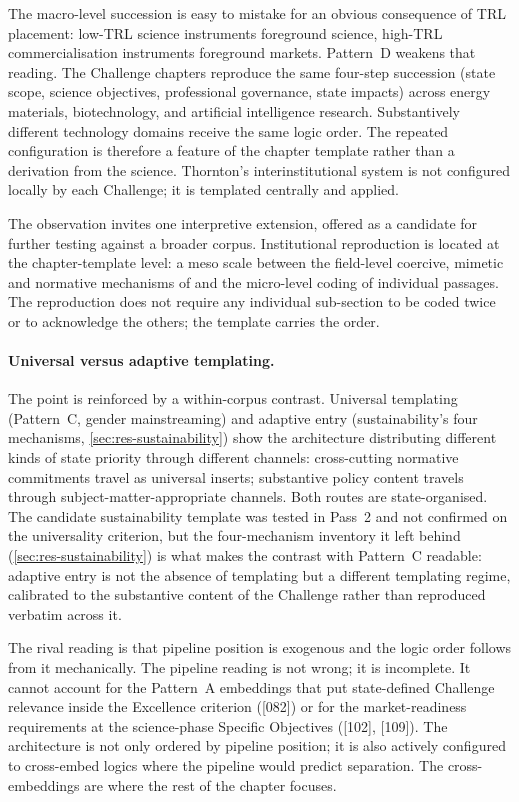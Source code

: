 The macro-level succession is easy to mistake for an obvious
consequence of TRL placement: low-TRL science instruments foreground
science, high-TRL commercialisation instruments foreground markets.
Pattern~D weakens that reading. The Challenge chapters reproduce the
same four-step succession (state scope, science objectives,
professional governance, state impacts) across energy materials,
biotechnology, and artificial intelligence research. Substantively
different technology domains receive the same logic order. The
repeated configuration is therefore a feature of the chapter template
rather than a derivation from the science. Thornton's
interinstitutional system is not configured locally by each Challenge;
it is templated centrally and applied.

The observation invites one interpretive extension, offered as a
candidate for further testing against a broader corpus. Institutional
reproduction is located at the chapter-template level: a meso scale
between the field-level coercive, mimetic and normative mechanisms of
\textcite{dimaggio1983iron} and the micro-level coding of individual
passages. The reproduction does not require any individual sub-section
to be coded twice or to acknowledge the others; the template carries
the order.

\paragraph{Universal versus adaptive templating.}\label{sec:disc-sustainability}
The point is reinforced by a within-corpus contrast. Universal
templating (Pattern~C, gender mainstreaming) and adaptive entry
(sustainability's four mechanisms, \cref{sec:res-sustainability})
show the architecture distributing different kinds of state priority
through different channels: cross-cutting normative commitments travel
as universal inserts; substantive policy content travels through
subject-matter-appropriate channels. Both routes are state-organised.
The candidate sustainability template was tested in Pass~2 and not
confirmed on the universality criterion, but the four-mechanism
inventory it left behind (\cref{sec:res-sustainability}) is what makes
the contrast with Pattern~C readable: adaptive entry is not the
absence of templating but a different templating regime, calibrated to
the substantive content of the Challenge rather than reproduced
verbatim across it.

The rival reading is that pipeline position is exogenous and the logic
order follows from it mechanically. The pipeline reading is not wrong;
it is incomplete. It cannot account for the Pattern~A embeddings that
put state-defined Challenge relevance inside the Excellence criterion
([082]) or for the market-readiness requirements at the science-phase
Specific Objectives ([102], [109]). The architecture is not only
ordered by pipeline position; it is also actively configured to
cross-embed logics where the pipeline would predict separation. The
cross-embeddings are where the rest of the chapter focuses.

